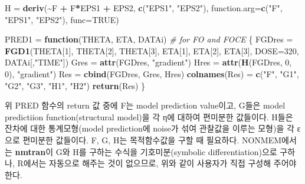 \documentclass[
  10pt,
  krantz2,
  a4paper]{krantz}
\newenvironment{Shaded}{\begin{snugshade}}{\end{snugshade}}
\newcommand{\CommentTok}[1]{\textcolor[rgb]{0.56,0.35,0.01}{\textit{#1}}}
\newcommand{\ControlFlowTok}[1]{\textcolor[rgb]{0.13,0.29,0.53}{\textbf{#1}}}
\newcommand{\DataTypeTok}[1]{\textcolor[rgb]{0.13,0.29,0.53}{#1}}
\newcommand{\DecValTok}[1]{\textcolor[rgb]{0.00,0.00,0.81}{#1}}
\newcommand{\KeywordTok}[1]{\textcolor[rgb]{0.13,0.29,0.53}{\textbf{#1}}}
\newcommand{\NormalTok}[1]{#1}
\newcommand{\OperatorTok}[1]{\textcolor[rgb]{0.81,0.36,0.00}{\textbf{#1}}}
\newcommand{\OtherTok}[1]{\textcolor[rgb]{0.56,0.35,0.01}{#1}}
\newcommand{\StringTok}[1]{\textcolor[rgb]{0.31,0.60,0.02}{#1}}
\theoremstyle{definition}
\theoremstyle{definition}
\theoremstyle{definition}
\theoremstyle{remark}
\begin{document}
\begin{Shaded}
\begin{Highlighting}[]
\NormalTok{H =}\StringTok{ }\KeywordTok{deriv}\NormalTok{(}\OperatorTok{\textasciitilde{}}\NormalTok{F }\OperatorTok{+}\StringTok{ }\NormalTok{F}\OperatorTok{*}\NormalTok{EPS1 }\OperatorTok{+}\StringTok{ }\NormalTok{EPS2, }\KeywordTok{c}\NormalTok{(}\StringTok{"EPS1"}\NormalTok{, }\StringTok{"EPS2"}\NormalTok{), }
          \DataTypeTok{function.arg=}\KeywordTok{c}\NormalTok{(}\StringTok{"F"}\NormalTok{, }\StringTok{"EPS1"}\NormalTok{, }\StringTok{"EPS2"}\NormalTok{), }
          \DataTypeTok{func=}\OtherTok{TRUE}\NormalTok{)}

\NormalTok{PRED1 =}\StringTok{ }\ControlFlowTok{function}\NormalTok{(THETA, ETA, DATAi)  }\CommentTok{\# for FO and FOCE}
\NormalTok{\{}
\NormalTok{  FGDres =}\StringTok{ }\KeywordTok{FGD1}\NormalTok{(THETA[}\DecValTok{1}\NormalTok{], THETA[}\DecValTok{2}\NormalTok{], THETA[}\DecValTok{3}\NormalTok{], ETA[}\DecValTok{1}\NormalTok{], ETA[}\DecValTok{2}\NormalTok{], ETA[}\DecValTok{3}\NormalTok{], }\DataTypeTok{DOSE=}\DecValTok{320}\NormalTok{, }
\NormalTok{                DATAi[,}\StringTok{"TIME"}\NormalTok{])}
\NormalTok{  Gres =}\StringTok{ }\KeywordTok{attr}\NormalTok{(FGDres, }\StringTok{"gradient"}\NormalTok{)}
\NormalTok{  Hres =}\StringTok{ }\KeywordTok{attr}\NormalTok{(}\KeywordTok{H}\NormalTok{(FGDres, }\DecValTok{0}\NormalTok{, }\DecValTok{0}\NormalTok{), }\StringTok{"gradient"}\NormalTok{)}
\NormalTok{  Res =}\StringTok{ }\KeywordTok{cbind}\NormalTok{(FGDres, Gres, Hres)}
  \KeywordTok{colnames}\NormalTok{(Res) =}\StringTok{ }\KeywordTok{c}\NormalTok{(}\StringTok{"F"}\NormalTok{, }\StringTok{"G1"}\NormalTok{, }\StringTok{"G2"}\NormalTok{, }\StringTok{"G3"}\NormalTok{, }\StringTok{"H1"}\NormalTok{, }\StringTok{"H2"}\NormalTok{)}
  \KeywordTok{return}\NormalTok{(Res)}
\NormalTok{\}}
\end{Highlighting}
\end{Shaded}


위 PRED 함수의 return 값 중에 F는 model prediction value이고, G들은 model predictiion function(structural model)을 각 η에 대하여 편미분한 값들이다. H들은 잔차에 대한 통계모형(model prediction에 noise가 섞여 관찰값을 이루는 모형)을 각 ε으로 편미분한 값들이다. F, G, H는 목적함수값을 구할 때 필요하다. NONMEM에서는 \textbf{nmtran}이 G와 H를 구하는 수식을 기호미분(symbolic differentiation)으로 구하나, R에서는 자동으로 해주는 것이 없으므로, 위와 같이 사용자가 직접 구성해 주어야 한다.
\end{document}
